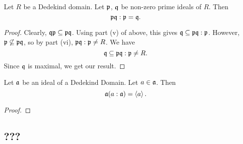 \begin{proposition}
  Let $R$ be a Dedekind domain.
  Let $\frak p$, $\frak q$ be non-zero prime ideals of $R$.
  Then \[ \frak p \frak q : \frak p = \frak q. \]
\end{proposition}
\begin{proof}
  Clearly, $\frak q \frak p \subseteq \frak p \frak q$.
  Using part (v) of above, this gives $\frak q \subseteq \frak p \frak q : \frak p$.
  However, $\frak p \not\subseteq \frak p \frak q$, so by part (vi),
  $\frak p \frak q : \frak p \neq R$.
  We have
  \[ \frak q \subseteq \frak p \frak q : \frak p \neq R. \]
  Since $\frak q$ is maximal, we get our result.
\end{proof}

\begin{proposition}
  Let $\frak a$ be an ideal of a Dedekind Domain.
  Let $a \in \frak a$.
  Then \[ \frak a (a : \frak a) = \left\langle a \right\rangle. \]
\end{proposition}
\begin{proof}
\end{proof}


\subsection{???}

